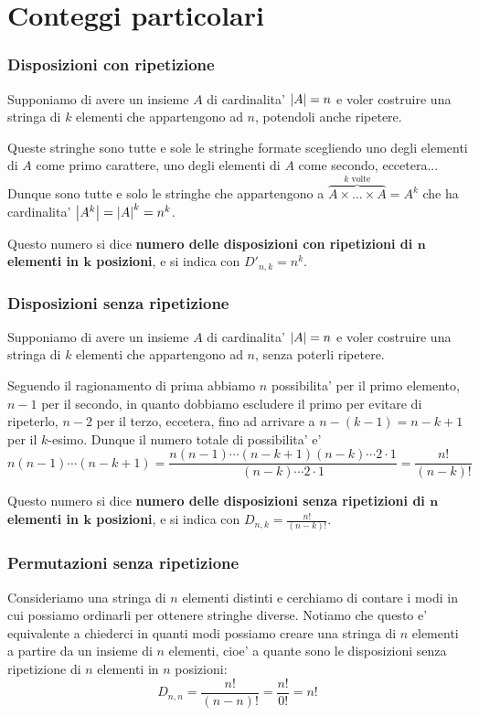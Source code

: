 \section{Conteggi particolari}

\subsubsection{Disposizioni con ripetizione}
Supponiamo di avere un insieme $A$ di cardinalita' $\left|A\right| = n$ e voler costruire una stringa di $k$ elementi che appartengono ad $n$, potendoli anche ripetere.

Queste stringhe sono tutte e sole le stringhe formate scegliendo uno degli elementi di $A$ come primo carattere, uno degli elementi di $A$ come secondo, eccetera... Dunque sono tutte e solo le stringhe che appartengono a $\overbrace{A \times \dots \times A}^{k \text{ volte}} = A^k$ che ha cardinalita' $\left|A^k\right| = \left|A\right|^k = n^k$.

Questo numero si dice \textbf{numero delle disposizioni con ripetizioni di $\bm{n}$ elementi in $\bm{k}$ posizioni}, e si indica con $D'_{n, k} = n^k$.

\subsubsection{Disposizioni senza ripetizione}
Supponiamo di avere un insieme $A$ di cardinalita' $\left|A\right| = n$ e voler costruire una stringa di $k$ elementi che appartengono ad $n$, senza poterli ripetere.

Seguendo il ragionamento di prima abbiamo $n$ possibilita' per il primo elemento, $n-1$ per il secondo, in quanto dobbiamo escludere il primo per evitare di ripeterlo, $n-2$ per il terzo, eccetera, fino ad arrivare a $n-(k-1) = n - k + 1$ per il $k$-esimo. Dunque il numero totale di possibilita' e' \[
    n(n-1)\cdots (n-k+1) = \frac{n(n-1)\cdots (n-k+1)(n-k)\cdots 2\cdot 1}{(n-k)\cdots 2\cdot 1} = \frac{n!}{(n-k)!}
\]

Questo numero si dice \textbf{numero delle disposizioni senza ripetizioni di $\bm{n}$ elementi in $\bm{k}$ posizioni}, e si indica con $D_{n, k} = \frac{n!}{(n-k)!}$.

\subsubsection{Permutazioni senza ripetizione}

Consideriamo una stringa di $n$ elementi distinti e cerchiamo di contare i modi in cui possiamo ordinarli per ottenere stringhe diverse. Notiamo che questo e' equivalente a chiederci in quanti modi possiamo creare una stringa di $n$ elementi a partire da un insieme di $n$ elementi, cioe' a quante sono le disposizioni senza ripetizione di $n$ elementi in $n$ posizioni: \[
    D_{n, n} = \frac{n!}{(n - n)!} = \frac{n!}{0!} = n!    
\]

